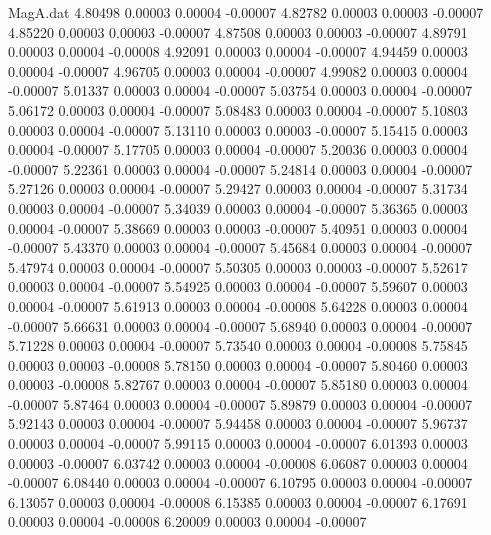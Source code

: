 \begin{filecontents}{MagA.dat}
   4.80498    0.00003    0.00004   -0.00007
   4.82782    0.00003    0.00003   -0.00007
   4.85220    0.00003    0.00003   -0.00007
   4.87508    0.00003    0.00003   -0.00007
   4.89791    0.00003    0.00004   -0.00008
   4.92091    0.00003    0.00004   -0.00007
   4.94459    0.00003    0.00004   -0.00007
   4.96705    0.00003    0.00004   -0.00007
   4.99082    0.00003    0.00004   -0.00007
   5.01337    0.00003    0.00004   -0.00007
   5.03754    0.00003    0.00004   -0.00007
   5.06172    0.00003    0.00004   -0.00007
   5.08483    0.00003    0.00004   -0.00007
   5.10803    0.00003    0.00004   -0.00007
   5.13110    0.00003    0.00003   -0.00007
   5.15415    0.00003    0.00004   -0.00007
   5.17705    0.00003    0.00004   -0.00007
   5.20036    0.00003    0.00004   -0.00007
   5.22361    0.00003    0.00004   -0.00007
   5.24814    0.00003    0.00004   -0.00007
   5.27126    0.00003    0.00004   -0.00007
   5.29427    0.00003    0.00004   -0.00007
   5.31734    0.00003    0.00004   -0.00007
   5.34039    0.00003    0.00004   -0.00007
   5.36365    0.00003    0.00004   -0.00007
   5.38669    0.00003    0.00003   -0.00007
   5.40951    0.00003    0.00004   -0.00007
   5.43370    0.00003    0.00004   -0.00007
   5.45684    0.00003    0.00004   -0.00007
   5.47974    0.00003    0.00004   -0.00007
   5.50305    0.00003    0.00003   -0.00007
   5.52617    0.00003    0.00004   -0.00007
   5.54925    0.00003    0.00004   -0.00007
   5.59607    0.00003    0.00004   -0.00007
   5.61913    0.00003    0.00004   -0.00008
   5.64228    0.00003    0.00004   -0.00007
   5.66631    0.00003    0.00004   -0.00007
   5.68940    0.00003    0.00004   -0.00007
   5.71228    0.00003    0.00004   -0.00007
   5.73540    0.00003    0.00004   -0.00008
   5.75845    0.00003    0.00003   -0.00008
   5.78150    0.00003    0.00004   -0.00007
   5.80460    0.00003    0.00003   -0.00008
   5.82767    0.00003    0.00004   -0.00007
   5.85180    0.00003    0.00004   -0.00007
   5.87464    0.00003    0.00004   -0.00007
   5.89879    0.00003    0.00004   -0.00007
   5.92143    0.00003    0.00004   -0.00007
   5.94458    0.00003    0.00004   -0.00007
   5.96737    0.00003    0.00004   -0.00007
   5.99115    0.00003    0.00004   -0.00007
   6.01393    0.00003    0.00003   -0.00007
   6.03742    0.00003    0.00004   -0.00008
   6.06087    0.00003    0.00004   -0.00007
   6.08440    0.00003    0.00004   -0.00007
   6.10795    0.00003    0.00004   -0.00007
   6.13057    0.00003    0.00004   -0.00008
   6.15385    0.00003    0.00004   -0.00007
   6.17691    0.00003    0.00004   -0.00008
   6.20009    0.00003    0.00004   -0.00007

\end{filecontents}
